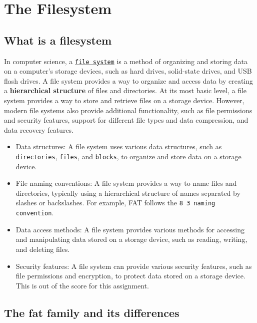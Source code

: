 \section{The Filesystem}

\subsection{What is a filesystem}

In computer science, a \href{https://en.wikipedia.org/wiki/File_system}{\texttt{file system}} is a method of organizing and storing data on a computer's storage devices, such as hard drives, solid-state drives, and USB flash drives. A file system provides a way to organize and access data by creating a \textbf{hierarchical structure} of files and directories.
At its most basic level, a file system provides a way to store and retrieve files on a storage device. However, modern file systems also provide additional functionality, such as file permissions and security features, support for different file types and data compression, and data recovery features.
\begin{itemize}
A file system typically consists of several key components, including:
    \item Data structures: A file system uses various data structures, such as \texttt{directories}, \texttt{files}, and \texttt{blocks}, to organize and store data on a storage device.
    
    \item  File naming conventions: A file system provides a way to name files and directories, typically using a hierarchical structure of names separated by slashes or backslashes. For example, FAT follows the \texttt{8 3 naming convention}.
    
    \item  Data access methods: A file system provides various methods for accessing and manipulating data stored on a storage device, such as reading, writing, and deleting files.
    
    \item Security features: A file system can provide various security features, such as file permissions and encryption, to protect data stored on a storage device. This is out of the score for this assignment.
    
\end{itemize}

\subsection{The fat family and its differences}


